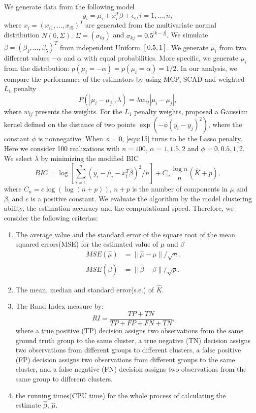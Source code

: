 \documentclass[review]{elsarticle}
\begin{document}
We generate data from the following model
\begin{equation}
\label{equ:14}
y_i = \mu_i + x_i^T\beta+\epsilon_i, i=1,...,n,
\end{equation}
where $x_i=(x_{i1},...,x_{i5})^T$ are generated from the multivariate normal distribution $N(0,\Sigma)$, $\Sigma=(\sigma_{kj})$ and $\sigma_{kj}=0.5^{|k-j|}$. We simulate $\beta=(\beta_1,...,\beta_5)^T$ from independent Uniform $[0.5, 1]$. We generate $\mu_i$ from two different values $-\alpha$ and $\alpha$ with equal probabilities. More specific, we generate $\mu_i$ from the distribution: $p(\mu_i=-\alpha)=p(\mu_i=\alpha)=1/2$. In our analysis, we compare the performance of the estimators by using MCP, SCAD and weighted $L_1$ penalty
\begin{equation}
\label{equ:15}
P(|\mu_i-\mu_j|,\lambda)=\lambda w_{ij}|\mu_i-\mu_j|,
\end{equation}
where $w_{ij}$ presents the weights. For the $L_1$ penalty weights, \cite{ma2017concave} proposed a Gaussian kernel defined on the distance of two points $\exp(-\phi(y_i-y_j)^2)$, where the constant $\phi$ is nonnegative. When $\phi=0$, \ref{equ:15} turns to be the Lasso penalty. Here we consider 100 realizations with $n=100$, $\alpha={1,1.5,2}$ and $\phi={0,0.5,1,2}$. We select $\lambda$ by minimizing the modified BIC
\begin{equation}
BIC=\log\left[\sum_{i=1}^n(y_i-\hat{\mu}_i-x_i^T\hat{\beta})^2/n\right]+C_n\frac{\log n}{n}(\hat{K}+p),
\end{equation}
where $C_n=c\log(\log(n+p))$, $n+p$ is the number of components in $\mu$ and $\beta$, and $c$ is a positive constant.
We evaluate the algorithm by the model clustering ability, the estimation accuracy and the computational speed. Therefore, we consider the following criterias:
\begin{enumerate}
	\item The average value and the standard error of the square root of the mean squared errors(MSE) for the estimated value of $\mu$ and $\beta$
	\begin{align}
	MSE(\hat{\mu})&=\lVert \hat{\mu}-\mu\rVert/\sqrt{n},\\
	MSE(\hat{\beta})&=\lVert\hat{\beta}-\beta\rVert/\sqrt{p}.
	\end{align}
	\item The mean, median and standard error(s.e.) of $\hat{K}$.
	\item The Rand Index measure \cite{rand1971objective} by:
	$$RI=\frac{TP+TN}{TP+FP+FN+TN},$$
	where a true positive (TP) decision assigns two observations from the same ground truth
	group to the same cluster, a true negative (TN) decision assigns two observations from
	different groups to different clusters, a false positive (FP) decision assigns two observations
	from different groups to the same cluster, and a false negative (FN) decision assigns two
	observations from the same group to different clusters.
	\item the running times(CPU time) for the whole process of calculating the estimate $\hat{\beta}$, $\hat{\mu}$.
\end{enumerate}
\end{document}
